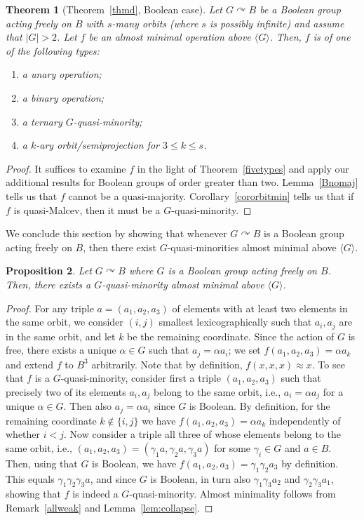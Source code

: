 \documentclass{article}
\newtheorem{theorem}{Theorem}[section]
\newtheorem{prop}[theorem]{Proposition}
\theoremstyle{remark}
\theoremstyle{definition}
\def\acts{\curvearrowright}
\begin{document}
\begin{theorem}[Theorem~\ref{thmd}, Boolean case]\label{Boolcase} Let $G\acts B$ be a Boolean group acting freely on $B$ with $s$-many orbits (where $s$ is possibly infinite) and assume that $|G|>2$. Let $f$ be an almost minimal operation above $\langle G \rangle$. Then,  $f$ is of one of the following types:
\begin{enumerate}
    \item a unary operation;
    \item a binary operation;
    \item a ternary $G$-quasi-minority;
    \item a $k$-ary orbit\-/semiprojection for $3\leq k \leq s$.
\end{enumerate} 
\end{theorem}
\begin{proof} It suffices to examine $f$ in the light of 
 Theorem~\ref{fivetypes} and apply our additional results for Boolean groups of order greater than two. Lemma~\ref{Bnomaj} tells us that $f$ cannot be a quasi-majority. Corollary~\ref{cororbitmin} tells us that if $f$ is quasi-Malcev, then it must be a $G$-quasi-minority.
\end{proof}

We conclude this section by showing that whenever $G\acts B$ is a Boolean group acting freely on $B$, then there exist $G$-quasi-minorities almost minimal above $\langle G\rangle$.

\begin{prop}\label{exmin} 
Let $G\acts B$ where $G$ is a Boolean group acting freely on $B$. Then, there exists a $G$-quasi-minority almost minimal above $\langle G\rangle$.
\end{prop}
\begin{proof}
For any triple $a=(a_1,a_2,a_3)$ of elements with at least two elements in the same orbit, we consider $(i,j)$  smallest lexicographically  such that  $a_i, a_j$ are in the same orbit, and let $k$ be the remaining coordinate. Since the action of $G$ is free, there exists a unique $\alpha\in G$ such that $a_j=\alpha a_i$; we set $f(a_1,a_2,a_3)=\alpha a_k$ and extend $f$ to $B^3$ arbitrarily. Note that by definition, $f(x,x,x)\approx x$. To see that $f$ is a $G$-quasi-minority, consider first a triple   $(a_1,a_2,a_3)$ such that precisely two of its  elements  $a_i, a_j$ belong to the same orbit, i.e.,  $a_i=\alpha a_j$ for a unique  $\alpha \in G$. Then also $a_j=\alpha a_i$ since $G$ is Boolean. By definition, for the remaining coordinate $k\notin\{i,j\}$ we have   $f(a_1,a_2,a_3)=\alpha a_k$  independently of whether $i<j$. Now consider a triple all three of whose  elements belong to the same orbit, i.e., $(a_1,a_2,a_3)=(\gamma_1 a, \gamma_2 a, \gamma_3 a)$ for some $\gamma_i \in G$ and $a\in B$. Then, using that $G$ is Boolean, we have  $f(a_1,a_2,a_3)=\gamma_1\gamma_2 a_3$ by definition. This equals $\gamma_1\gamma_2\gamma_3 a$, and since  $G$ is Boolean, in turn also $\gamma_1\gamma_3a_2$ and $\gamma_2\gamma_3 a_1$, showing that $f$ is indeed a $G$-quasi-minority. Almost minimality follows from Remark~\ref{allweak} and Lemma~\ref{lem:collapse}.
\end{proof}
\end{document}
